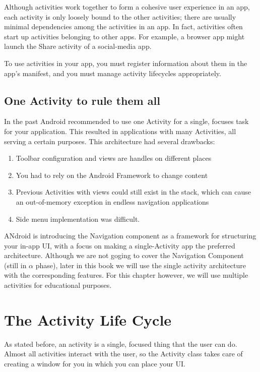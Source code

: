 Although activities work together to form a cohesive user experience in an app, each activity is only loosely bound to the other activities; there are usually minimal dependencies among the activities in an app. In fact, activities often start up activities belonging to other apps. For example, a browser app might launch the Share activity of a social-media app.

To use activities in your app, you must register information about them in the app’s manifest, and you must manage activity lifecycles appropriately. 

\subsection{One Activity to rule them all}
In the past Android recommended to use one Activity for a single, focuses task for your application. This resulted in applications with many Activities, all serving a certain purposes. This architecture had several drawbacks:

\begin{enumerate}
	\item Toolbar configuration and views are handles on different places
	\item You had to rely on the Android Framework to change content
	\item Previous Activities with views could still exist in the stack, which can cause an out-of-memory exception in endless navigation applications
	\item Side menu implementation was difficult.
\end{enumerate}
ANdroid is introducing the Navigation component as a framework for structuring your in-app UI, with a focus on making a single-Activity app the preferred architecture. Although we are not goging to cover the Navigation Component (still in $\alpha$ phase), later in this book we will use the single activity architecture with the corresponding features. For this chapter however, we will use multiple activities for educational purposes. 

\section{The Activity Life Cycle}
As stated before, an activity is a single, focused thing that the user can do. Almost all activities interact with the user, so the Activity class takes care of creating a window for you in which you can place your UI.


